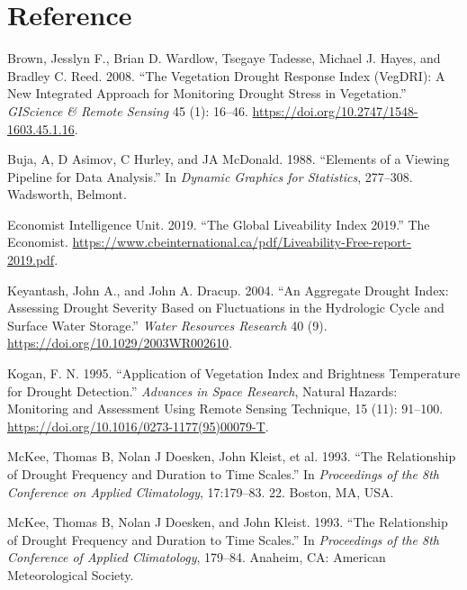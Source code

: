 \documentclass[
]{article}
\newlength{\cslhangindent}
\newlength{\cslentryspacingunit} %
\newenvironment{CSLReferences}[2] %
 {%
  \setlength{\parindent}{0pt}
  \ifodd #1
  \let\oldpar\par
  \def\par{\hangindent=\cslhangindent\oldpar}
  \fi
  \setlength{\parskip}{#2\cslentryspacingunit}
 }%
 {}
\begin{document}
\hypertarget{reference}{%
\section*{Reference}\label{reference}}

\hypertarget{refs}{}
\begin{CSLReferences}{1}{0}
\leavevmode{}%
Brown, Jesslyn F., Brian D. Wardlow, Tsegaye Tadesse, Michael J. Hayes,
and Bradley C. Reed. 2008. {``The {Vegetation} {Drought} {Response}
{Index} ({VegDRI}): {A} {New} {Integrated} {Approach} for {Monitoring}
{Drought} {Stress} in {Vegetation}.''} \emph{GIScience \& Remote
Sensing} 45 (1): 16--46.
\url{https://doi.org/10.2747/1548-1603.45.1.16}.

\leavevmode{}%
Buja, A, D Asimov, C Hurley, and JA McDonald. 1988. {``Elements of a
Viewing Pipeline for Data Analysis.''} In \emph{Dynamic Graphics for
Statistics}, 277--308. Wadsworth, Belmont.

\leavevmode{}%
Economist Intelligence Unit. 2019. {``The Global Liveability Index
2019.''} The Economist.
\url{https://www.cbeinternational.ca/pdf/Liveability-Free-report-2019.pdf}.

\leavevmode{}%
Keyantash, John A., and John A. Dracup. 2004. {``An Aggregate Drought
Index: {Assessing} Drought Severity Based on Fluctuations in the
Hydrologic Cycle and Surface Water Storage.''} \emph{Water Resources
Research} 40 (9). \url{https://doi.org/10.1029/2003WR002610}.

\leavevmode{}%
Kogan, F. N. 1995. {``Application of Vegetation Index and Brightness
Temperature for Drought Detection.''} \emph{Advances in Space Research},
Natural {Hazards}: {Monitoring} and {Assessment} {Using} {Remote}
{Sensing} {Technique}, 15 (11): 91--100.
\url{https://doi.org/10.1016/0273-1177(95)00079-T}.

\leavevmode{}%
McKee, Thomas B, Nolan J Doesken, John Kleist, et al. 1993. {``The
Relationship of Drought Frequency and Duration to Time Scales.''} In
\emph{Proceedings of the 8th Conference on Applied Climatology},
17:179--83. 22. Boston, MA, USA.

\leavevmode{}%
McKee, Thomas B, Nolan J Doesken, and John Kleist. 1993. {``The
Relationship of Drought Frequency and Duration to Time Scales.''} In
\emph{Proceedings of the 8th Conference of Applied Climatology},
179--84. Anaheim, CA: American Meteorological Society.


\end{CSLReferences}
\end{document}
